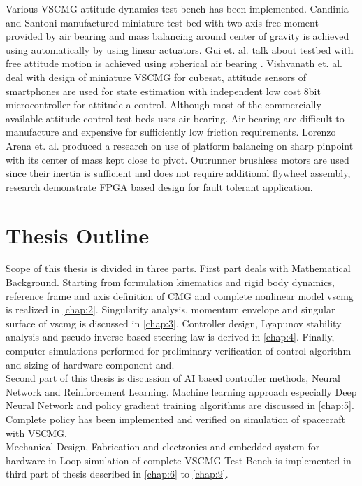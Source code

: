 \noindent%
Various VSCMG attitude dynamics test bench has been implemented.  Candinia and Santoni manufactured miniature test bed with two axis free moment provided by air bearing and mass balancing around center of gravity is achieved using automatically by using linear actuators. \cite{Candinia2012} Gui et. al. talk about testbed with free attitude motion is achieved using spherical air bearing \cite{Gui2015}. Vishvanath et. al. deal with design of miniature VSCMG for cubesat, attitude sensors of smartphones are used for state estimation with independent low cost 8bit microcontroller for attitude a control.\cite{2015arXiv150903677P}  Although most of the commercially available attitude control test beds uses air bearing. Air bearing are difficult to manufacture and expensive for sufficiently low friction requirements.
Lorenzo Arena et. al. produced a research on use of platform balancing on sharp pinpoint with its center of mass kept close to pivot. Outrunner brushless motors are used since their inertia is sufficient and does not require additional flywheel assembly, research demonstrate FPGA based design for fault tolerant application. \cite{doi:10.1061/(ASCE)AS.1943-5525.0000754}




\section{Thesis Outline}
Scope of this thesis is divided in three parts. First part deals with Mathematical Background. Starting from formulation kinematics and rigid body dynamics, reference frame and axis definition of CMG and complete nonlinear model \acrshort{vscmg} is realized in \autoref{chap:2}. Singularity analysis, momentum envelope and singular surface of \acrshort{vscmg} is discussed in \autoref{chap:3}. Controller design, Lyapunov stability analysis and pseudo inverse based steering law is derived in \autoref{chap:4}. Finally, computer simulations performed for preliminary verification of control algorithm and sizing of hardware component and.\\


\noindent Second part of this thesis is discussion of AI based controller methods, Neural Network and Reinforcement Learning. Machine learning approach especially Deep Neural Network and policy gradient training algorithms are discussed in \autoref{chap:5}. Complete policy has been implemented and verified on simulation of spacecraft with VSCMG.\\


\noindent Mechanical Design, Fabrication and electronics and embedded system for hardware in Loop simulation of complete VSCMG Test Bench is implemented in third part of thesis described in \autoref{chap:6} to \autoref{chap:9}.
